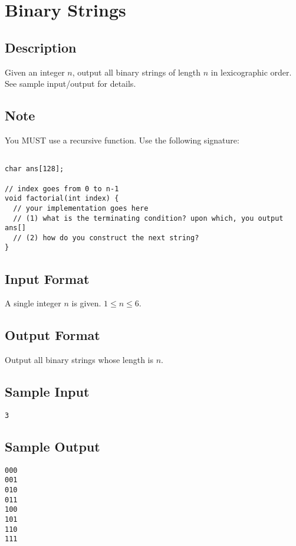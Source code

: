 

\begin{center}\end{center}
\vspace{5mm}


\section{Binary Strings}

\subsection*{Description}
Given an integer $n$, output all binary strings of length $n$ in lexicographic order. See sample input/output for details.

\subsection*{Note}
You MUST use a recursive function. Use the following signature:
\begin{verbatim}

char ans[128];

// index goes from 0 to n-1
void factorial(int index) {
  // your implementation goes here
  // (1) what is the terminating condition? upon which, you output ans[]
  // (2) how do you construct the next string?
}
\end{verbatim}

\subsection*{Input Format}
A single integer $n$ is given. $1\leq n \leq 6$. 

\subsection*{Output Format}
Output all binary strings whose length is $n$. 

\subsection*{Sample Input}
\begin{verbatim}
3
\end{verbatim}

\subsection*{Sample Output}
\begin{verbatim}
000
001
010
011
100
101
110
111
\end{verbatim}


